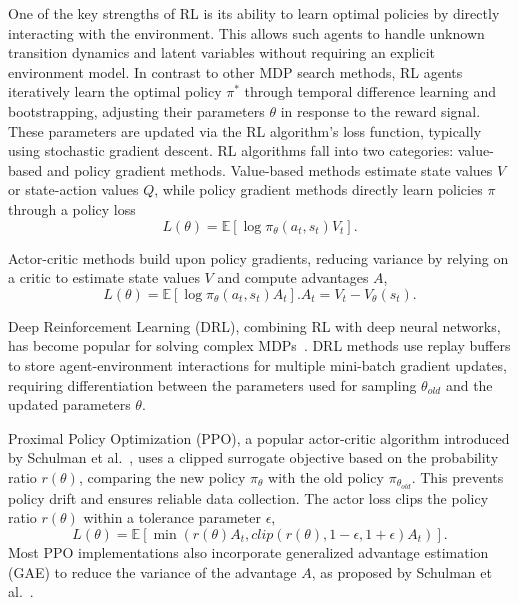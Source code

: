 \documentclass[preprint, 12pt]{elsarticle}
\begin{document}
One of the key strengths of RL is its ability to learn optimal policies by directly interacting with the environment. This allows such agents to handle unknown transition dynamics and latent variables without requiring an explicit environment model.
In contrast to other MDP search methods, RL agents iteratively learn the optimal policy $\pi^*$ through temporal difference learning and bootstrapping, adjusting their parameters $\theta$ in response to the reward signal. These parameters are updated via the RL algorithm's loss function, typically using stochastic gradient descent.
RL algorithms fall into two categories: value-based and policy gradient methods. Value-based methods estimate state values $V$ or state-action values $Q$, while policy gradient methods directly learn policies $\pi$ through a policy loss
\begin{equation}
    \label{eq:NaivePGLoss}
    L(\theta) = \mathbb{E}  \left[ \log \pi_{\theta}(a_t, s_t) V_t\right].
\end{equation}

Actor-critic methods build upon policy gradients, reducing variance by relying on a critic to estimate state values $V$ and compute advantages $A$, 
\begin{equation}
    \label{eq:ACPGLoss}
    L(\theta) = \mathbb{E}  \left[ \log \pi_{\theta}(a_t, s_t) A_t\right].
    A_t = V_t - V_{\theta}(s_t).
\end{equation}

Deep Reinforcement Learning (DRL), combining RL with deep neural networks, has become popular for solving complex MDPs~\cite{Alpha0, OpenAi5, DQN}. DRL methods use replay buffers to store agent-environment interactions for multiple mini-batch gradient updates, requiring differentiation between the parameters used for sampling $\theta_{old}$ and the updated parameters $\theta$.

Proximal Policy Optimization (PPO), a popular actor-critic algorithm introduced by Schulman et al.~\cite{Schulman_PPO}, uses a clipped surrogate objective based on the probability ratio $r(\theta)$, comparing the new policy $\pi_{\theta}$ with the old policy $\pi_{\theta_{old}}$. This prevents policy drift and ensures reliable data collection. The actor loss clips the policy ratio $r(\theta)$ within a tolerance parameter $\epsilon$, 
\begin{equation}
    \label{eq:PPOLoss}
    L(\theta) = \mathbb{E} \left[ \min \left(  r(\theta) A_t, clip(r(\theta), 1-\epsilon, 1+\epsilon) A_t\right) \right].
\end{equation}
Most PPO implementations also incorporate generalized advantage estimation (GAE) to reduce the variance of the advantage $A$, as proposed by Schulman et al.~\cite{Schulman_GAE}.
\end{document}
